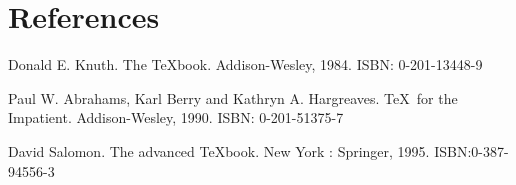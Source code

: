 \section*{References}

\begin{enumerate}[{$[$}1{$]$}]
\item Donald E. Knuth. The \TeX book. Addison-Wesley, 1984. ISBN: 0-201-13448-9
\item Paul W. Abrahams, Karl Berry and Kathryn A. Hargreaves. \TeX\ for the
  Impatient. Addison-Wesley, 1990. ISBN: 0-201-51375-7
\item David Salomon. The advanced \TeX book.  New York : Springer, 1995. ISBN:0-387-94556-3
\end{enumerate}
